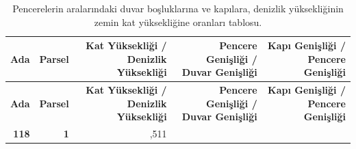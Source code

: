 \documentclass[12pt,turkish,a4paperpaper,]{report}
\begin{document}
\begin{longtable}[]{@{}rrrrr@{}}
\caption{Pencerelerin aralarındaki duvar boşluklarına ve kapılara,
denizlik yüksekliğinin zemin kat yüksekliğine oranları tablosu.
\label{PKDOran}}\tabularnewline
\toprule
\begin{minipage}[b]{0.05\columnwidth}\raggedleft
\textbf{Ada}\strut
\end{minipage} & \begin{minipage}[b]{0.07\columnwidth}\raggedleft
\textbf{Parsel}\strut
\end{minipage} & \begin{minipage}[b]{0.25\columnwidth}\raggedleft
\textbf{Kat Yüksekliği / Denizlik Yüksekliği}\strut
\end{minipage} & \begin{minipage}[b]{0.25\columnwidth}\raggedleft
\textbf{Pencere Genişliği / Duvar Genişliği}\strut
\end{minipage} & \begin{minipage}[b]{0.24\columnwidth}\raggedleft
\textbf{Kapı Genişliği / Pencere Genişliği}\strut
\end{minipage}\tabularnewline
\midrule
\endfirsthead
\toprule
\begin{minipage}[b]{0.05\columnwidth}\raggedleft
\textbf{Ada}\strut
\end{minipage} & \begin{minipage}[b]{0.07\columnwidth}\raggedleft
\textbf{Parsel}\strut
\end{minipage} & \begin{minipage}[b]{0.25\columnwidth}\raggedleft
\textbf{Kat Yüksekliği / Denizlik Yüksekliği}\strut
\end{minipage} & \begin{minipage}[b]{0.25\columnwidth}\raggedleft
\textbf{Pencere Genişliği / Duvar Genişliği}\strut
\end{minipage} & \begin{minipage}[b]{0.24\columnwidth}\raggedleft
\textbf{Kapı Genişliği / Pencere Genişliği}\strut
\end{minipage}\tabularnewline
\midrule
\endhead
\begin{minipage}[t]{0.05\columnwidth}\raggedleft
\textbf{118}\strut
\end{minipage} & \begin{minipage}[t]{0.07\columnwidth}\raggedleft
\textbf{1}\strut
\end{minipage} & \begin{minipage}[t]{0.25\columnwidth}\raggedleft
7,511\strut
\end{minipage} & \begin{minipage}[t]{0.25\columnwidth}\raggedleft

\end{minipage}
\end{longtable}
\end{document}
